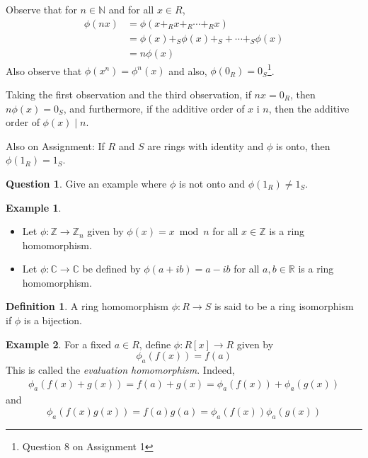 \documentclass[11pt]{article}
\theoremstyle{definition}\newtheorem{definition}{Definition}
\theoremstyle{definition}\newtheorem*{notation}{Notation}
\theoremstyle{definition}\newtheorem{example}{Example}
\theoremstyle{theorem}\newtheorem{theorem}{Theorem}
\theoremstyle{theorem}\newtheorem{corollary}{Corollary}
\theoremstyle{theorem}\newtheorem{proposition}{Proposition}
\theoremstyle{theorem}\newtheorem{lemma}{Lemma}
\theoremstyle{theorem}\newtheorem{question}{Question}
\theoremstyle{remark}\newtheorem{remark}{Remark}
\newcommand{\C}{\mathbb{C}}
\newcommand{\R}{\mathbb{R}}
\newcommand{\Z}{\mathbb{Z}}
\newcommand{\N}{\mathbb{N}}
\begin{document}
Observe that for $n \in \N$ and for all $x \in R$,
\begin{align*}
    \phi(nx) &= \phi(x +_R x +_R \cdots +_R x) \\
    &= \phi(x) +_S \phi(x) +_S + \cdots +_S \phi(x) \\
    &= n\phi(x)
\end{align*}
Also observe that $\phi(x^n) = \phi^n(x)$ and also, $\phi(0_R) = 0_S$\footnote{Question 8 on Assignment 1}.

Taking the first observation and the third observation, if $nx = 0_R$, then $n\phi(x) = 0_S$, and furthermore, if the additive order of $x$ i $n$, then the additive order of $\phi(x) \mid n$.

Also on Assignment: If $R$ and $S$ are rings with identity and $\phi$ is onto, then $\phi(1_R) = 1_S$.

\begin{question}
    Give an example where $\phi$ is not onto and $\phi(1_R) \neq 1_S$.
\end{question}

\begin{example}
    \begin{itemize}
        \item Let $\phi : \Z \to \Z_n$ given by $\phi(x) = x \bmod n$ for all $x \in \Z$ is a ring homomorphism.
        \item Let $\phi : \C \to \C$ be defined by $\phi(a + ib) = a - ib$ for all $a, b \in \R$ is a ring homomorphism.
    \end{itemize}
\end{example}

\begin{definition}
    A ring homomorphism $\phi : R \to S$ is said to be a ring isomorphism if $\phi$ is a bijection.
\end{definition}

\begin{example}
    For a fixed $a \in R$, define $\phi : R[x] \to R$ given by
    \begin{equation*}
        \phi_a(f(x)) = f(a)
    \end{equation*}
    This is called the \emph{evaluation homomorphism}. Indeed,
    \begin{align*}
        \phi_a(f(x) + g(x)) = f(a) + g(x) = \phi_a(f(x)) + \phi_a(g(x))
    \end{align*}
    and
    \begin{equation*}
        \phi_a(f(x)g(x)) = f(a)g(a) = \phi_a(f(x))\phi_a(g(x))
    \end{equation*}
\end{example}
\end{document}
